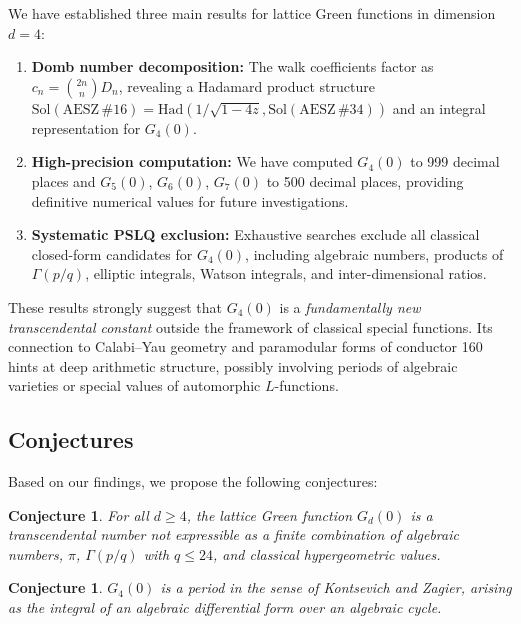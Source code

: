 \documentclass[12pt,a4paper]{article}
\numberwithin{equation}{section}
\theoremstyle{plain}
\newtheorem{conjecture}[theorem]{Conjecture}
\theoremstyle{definition}
\theoremstyle{remark}
\newcommand{\Had}{\mathrm{Had}}
\newcommand{\aesz}[1]{\mathrm{AESZ}\,\#\!{#1}}
\begin{document}
We have established three main results for lattice Green functions in dimension $d = 4$:
\begin{enumerate}[leftmargin=*,itemsep=3pt]
  \item \textbf{Domb number decomposition:} The walk coefficients factor as $c_n = \binom{2n}{n} D_n$,
    revealing a Hadamard product structure $\mathrm{Sol}(\aesz{16}) = \Had(1/\sqrt{1-4z}, \mathrm{Sol}(\aesz{34}))$ and an
    integral representation for $G_4(0)$.

  \item \textbf{High-precision computation:} We have computed $G_4(0)$ to 999 decimal places
    and $G_5(0)$, $G_6(0)$, $G_7(0)$ to 500 decimal places, providing definitive numerical values
    for future investigations.

  \item \textbf{Systematic PSLQ exclusion:} Exhaustive searches exclude all classical closed-form
    candidates for $G_4(0)$, including algebraic numbers, products of $\Gamma(p/q)$, elliptic integrals,
    Watson integrals, and inter-dimensional ratios.
\end{enumerate}

These results strongly suggest that $G_4(0)$ is a \emph{fundamentally new transcendental constant}
outside the framework of classical special functions. Its connection to Calabi--Yau geometry and
paramodular forms of conductor 160 hints at deep arithmetic structure, possibly involving periods
of algebraic varieties or special values of automorphic $L$-functions.

\subsection{Conjectures}

Based on our findings, we propose the following conjectures:

\begin{conjecture}\label{conj:transcendental}
  For all $d \geq 4$, the lattice Green function $G_d(0)$ is a transcendental number not expressible
  as a finite combination of algebraic numbers, $\pi$, $\Gamma(p/q)$ with $q \leq 24$, and
  classical hypergeometric values.
\end{conjecture}

\begin{conjecture}\label{conj:period}
  $G_4(0)$ is a period in the sense of Kontsevich and Zagier, arising as the integral of an
  algebraic differential form over an algebraic cycle.
\end{conjecture}
\end{document}
